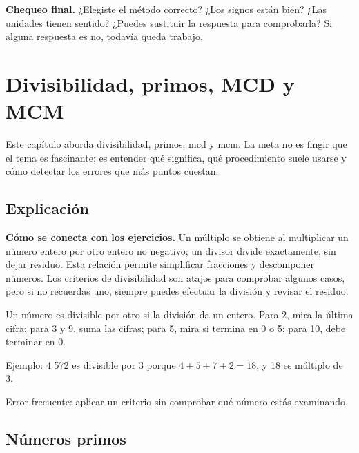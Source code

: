 \documentclass[10pt,oneside,openany]{book}
\begin{document}
\begin{idea}\textbf{Chequeo final.} ¿Elegiste el método correcto? ¿Los signos están bien? ¿Las unidades tienen sentido? ¿Puedes sustituir la respuesta para comprobarla? Si alguna respuesta es no, todavía queda trabajo.\end{idea}



\chapter{Divisibilidad, primos, MCD y MCM}

\begin{idea}
Este capítulo aborda divisibilidad, primos, mcd y mcm. La meta no es fingir que el tema es fascinante; es entender qué significa, qué procedimiento suele usarse y cómo detectar los errores que más puntos cuestan.
\end{idea}

\section{Explicación}

\textbf{Cómo se conecta con los ejercicios.} Un múltiplo se obtiene al multiplicar un número entero por otro entero no negativo; un divisor divide exactamente, sin dejar residuo. Esta relación permite simplificar fracciones y descomponer números. Los criterios de divisibilidad son atajos para comprobar algunos casos, pero si no recuerdas uno, siempre puedes efectuar la división y revisar el residuo.

Un número es divisible por otro si la división da un entero. Para 2, mira la última cifra; para 3 y 9, suma las cifras; para 5, mira si termina en 0 o 5; para 10, debe terminar en 0.



\begin{ejemplo}
Ejemplo: 4 572 es divisible por 3 porque $4+5+7+2=18$, y 18 es múltiplo de 3.
\end{ejemplo}

\begin{ojo}
Error frecuente: aplicar un criterio sin comprobar qué número estás examinando.
\end{ojo}



\section{Números primos}
\end{document}
